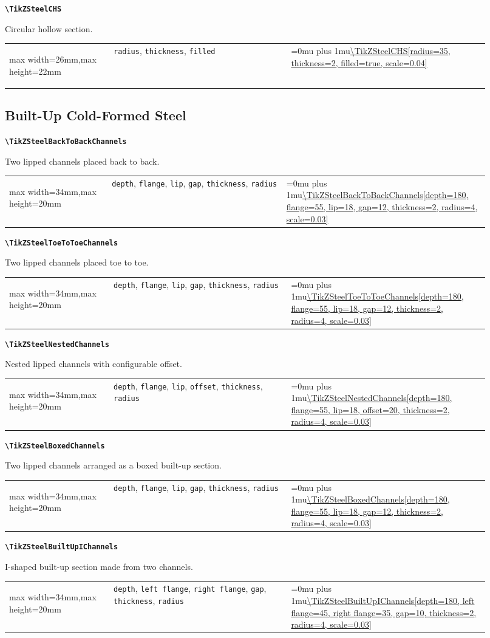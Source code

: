 \documentclass[10pt]{article}
\makeatletter
\newcommand{\command}[1]{\texttt{\textbackslash #1}}
\newcommand{\keyname}[1]{\texttt{#1}}
\newcommand{\CodeInline}[1]{%
  \begingroup
  \ttfamily\scriptsize\raggedright\Urlmuskip=0mu plus 1mu\url{#1}%
  \endgroup
}
\newcommand{\ShapePreview}[1]{%
  \begin{center}
  \begin{adjustbox}{max width=26mm,max height=22mm}
    \begin{tikzpicture}
      #1
    \end{tikzpicture}
  \end{adjustbox}
  \end{center}
}
\newcommand{\WideShapePreview}[1]{%
  \begin{center}
  \begin{adjustbox}{max width=34mm,max height=20mm}
    \begin{tikzpicture}
      #1
    \end{tikzpicture}
  \end{adjustbox}
  \end{center}
}
\newcommand{\ReferenceRow}[6]{%
  \textbf{\command{#1}}\par
  #2\par
  \vspace{2pt}
  \begin{tabular}{@{}p{0.20\linewidth}p{0.34\linewidth}p{0.38\linewidth}@{}}
    #6 & \footnotesize #3 & \CodeInline{#4}
  \end{tabular}
  \par\vspace{4mm}
}
\makeatother
\begin{document}
\ReferenceRow
  {TikZSteelCHS}
  {Circular hollow section.}
  {\keyname{radius}, \keyname{thickness}, \keyname{filled}}
  {\TikZSteelCHS[radius=35, thickness=2, filled=true, scale=0.04]}
  {}
  {\ShapePreview{\TikZSteelCHS[radius=35, thickness=2, filled=true, scale=0.04]}}

\subsection{Built-Up Cold-Formed Steel}

\ReferenceRow
  {TikZSteelBackToBackChannels}
  {Two lipped channels placed back to back.}
  {\keyname{depth}, \keyname{flange}, \keyname{lip}, \keyname{gap}, \keyname{thickness}, \keyname{radius}}
  {\TikZSteelBackToBackChannels[depth=180, flange=55, lip=18, gap=12, thickness=2, radius=4, scale=0.03]}
  {}
  {\WideShapePreview{\TikZSteelBackToBackChannels[depth=180, flange=55, lip=18, gap=12, thickness=2, radius=4, scale=0.03]}}

\ReferenceRow
  {TikZSteelToeToToeChannels}
  {Two lipped channels placed toe to toe.}
  {\keyname{depth}, \keyname{flange}, \keyname{lip}, \keyname{gap}, \keyname{thickness}, \keyname{radius}}
  {\TikZSteelToeToToeChannels[depth=180, flange=55, lip=18, gap=12, thickness=2, radius=4, scale=0.03]}
  {}
  {\WideShapePreview{\TikZSteelToeToToeChannels[depth=180, flange=55, lip=18, gap=12, thickness=2, radius=4, scale=0.03]}}

\ReferenceRow
  {TikZSteelNestedChannels}
  {Nested lipped channels with configurable offset.}
  {\keyname{depth}, \keyname{flange}, \keyname{lip}, \keyname{offset}, \keyname{thickness}, \keyname{radius}}
  {\TikZSteelNestedChannels[depth=180, flange=55, lip=18, offset=20, thickness=2, radius=4, scale=0.03]}
  {}
  {\WideShapePreview{\TikZSteelNestedChannels[depth=180, flange=55, lip=18, offset=20, thickness=2, radius=4, scale=0.03]}}

\ReferenceRow
  {TikZSteelBoxedChannels}
  {Two lipped channels arranged as a boxed built-up section.}
  {\keyname{depth}, \keyname{flange}, \keyname{lip}, \keyname{gap}, \keyname{thickness}, \keyname{radius}}
  {\TikZSteelBoxedChannels[depth=180, flange=55, lip=18, gap=12, thickness=2, radius=4, scale=0.03]}
  {}
  {\WideShapePreview{\TikZSteelBoxedChannels[depth=180, flange=55, lip=18, gap=12, thickness=2, radius=4, scale=0.03]}}

\ReferenceRow
  {TikZSteelBuiltUpIChannels}
  {I-shaped built-up section made from two channels.}
  {\keyname{depth}, \keyname{left flange}, \keyname{right flange}, \keyname{gap}, \keyname{thickness}, \keyname{radius}}
  {\TikZSteelBuiltUpIChannels[depth=180, left flange=45, right flange=35, gap=10, thickness=2, radius=4, scale=0.03]}
  {}
  {\WideShapePreview{\TikZSteelBuiltUpIChannels[depth=180, left flange=45, right flange=35, gap=10, thickness=2, radius=4, scale=0.03]}}
\end{document}
